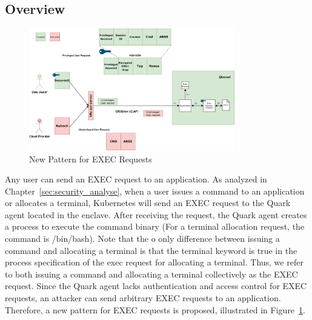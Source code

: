 \subsection{Overview}



\begin{figure}[!htb]
    \centering
    \includegraphics[width=0.8\textwidth]{images/new_pattern_of_exec.png}
    \caption[New Pattern for EXEC Requests]{New Pattern for EXEC Requests}
    \label{fig:new_pattern_of_exec}
\end{figure}


Any user can send an EXEC request to an application. As analyzed in Chapter~\ref{sec:security_analyse}, when a user issues a command to an application or allocates a terminal, Kubernetes will send an EXEC request to the Quark agent located in the enclave. After receiving 
the request, the Quark agent creates a process to execute the command binary (For a terminal allocation request, the command is /bin/bash). Note that the o only difference between issuing a command and allocating a terminal is that the terminal 
keyword is true in the process specification of the exec request for allocating a terminal. Thus, we refer to both issuing a command and allocating a terminal collectively as the EXEC request. Since the Quark agent lacks authentication and access 
control for EXEC requests, an attacker can send arbitrary EXEC requests to an application. Therefore, a new pattern for EXEC requests is proposed, illustrated in Figure~\ref{fig:new_pattern_of_exec}.

